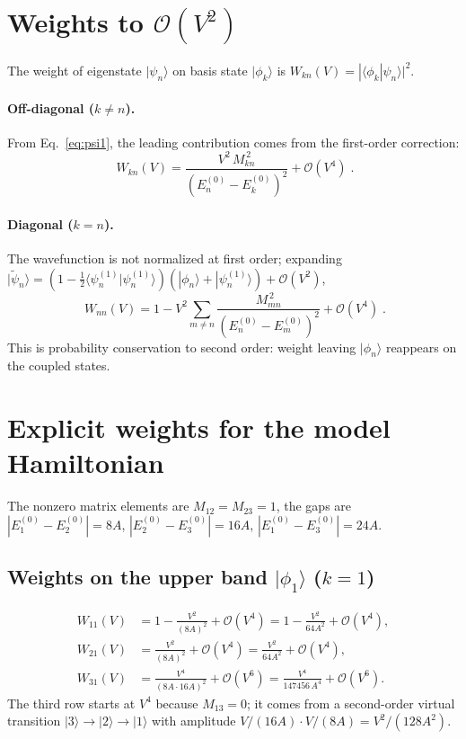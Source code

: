\documentclass[11pt]{article}
\begin{document}
\section{Weights to $\mathcal O(V^2)$}

The weight of eigenstate $|\psi_n\rangle$ on basis state $|\phi_k\rangle$ is $W_{kn}(V) = |\langle\phi_k|\psi_n\rangle|^2$.

\paragraph{Off-diagonal ($k\neq n$).}
From Eq.~\eqref{eq:psi1}, the leading contribution comes from the first-order correction:
\begin{equation}
\boxed{\;W_{kn}(V) = \frac{V^2\,M_{kn}^{\,2}}{(E_n^{(0)} - E_k^{(0)})^2} + \mathcal O(V^4)\;}. \label{eq:Woff}
\end{equation}

\paragraph{Diagonal ($k = n$).}
The wavefunction is not normalized at first order; expanding
$|\tilde\psi_n\rangle = (1 - \tfrac12\langle\psi_n^{(1)}|\psi_n^{(1)}\rangle)(|\phi_n\rangle + |\psi_n^{(1)}\rangle) + \mathcal O(V^2)$,
\begin{equation}
\boxed{\;W_{nn}(V) = 1 - V^2 \sum_{m\neq n} \frac{M_{mn}^{\,2}}{(E_n^{(0)} - E_m^{(0)})^2} + \mathcal O(V^4)\;}. \label{eq:Wdiag}
\end{equation}
This is probability conservation to second order: weight leaving $|\phi_n\rangle$ reappears on the coupled states.

\section{Explicit weights for the model Hamiltonian}

The nonzero matrix elements are $M_{12}=M_{23}=1$, the gaps are
$|E_1^{(0)} - E_2^{(0)}| = 8A$, $|E_2^{(0)} - E_3^{(0)}| = 16A$, $|E_1^{(0)} - E_3^{(0)}| = 24A$.

\subsection{Weights on the upper band $|\phi_1\rangle$ ($k=1$)}

\begin{align}
W_{11}(V) &= 1 - \frac{V^2}{(8A)^2} + \mathcal O(V^4) = 1 - \frac{V^2}{64A^2} + \mathcal O(V^4),\\
W_{21}(V) &= \frac{V^2}{(8A)^2} + \mathcal O(V^4) = \frac{V^2}{64A^2} + \mathcal O(V^4),\\
W_{31}(V) &= \frac{V^4}{(8A \cdot 16A)^2} + \mathcal O(V^6) = \frac{V^4}{147456\,A^4} + \mathcal O(V^6).
\end{align}
The third row starts at $V^4$ because $M_{13}=0$; it comes from a second-order virtual transition $|3\rangle \to |2\rangle \to |1\rangle$ with amplitude $V/(16A) \cdot V/(8A) = V^2/(128A^2)$.
\end{document}
